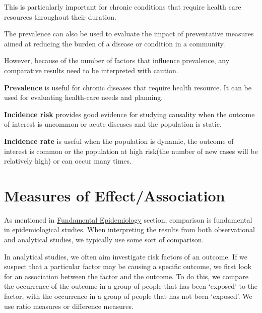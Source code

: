 \documentclass[
  letterpaper,
  DIV=11,
  numbers=noendperiod]{scrreprt}
\begin{document}
This is particularly important for chronic conditions that require
health care resources throughout their duration.

The prevalence can also be used to evaluate the impact of preventative
measures aimed at reducing the burden of a disease or condition in a
community.

However, because of the number of factors that influence prevalence, any
comparative results need to be interpreted with caution.

\begin{tcolorbox}[enhanced jigsaw, bottomtitle=1mm, breakable, colframe=quarto-callout-important-color-frame, leftrule=.75mm, opacityback=0, opacitybacktitle=0.6, left=2mm, colbacktitle=quarto-callout-important-color!10!white, coltitle=black, rightrule=.15mm, toptitle=1mm, colback=white, titlerule=0mm, title=\textcolor{quarto-callout-important-color}{\faExclamation}\hspace{0.5em}{Important}, arc=.35mm, bottomrule=.15mm, toprule=.15mm]

\textbf{Prevalence} is useful for chronic diseases that require health
resource. It can be used for evaluating health-care needs and planning.

\textbf{Incidence risk} provides good evidence for studying causality
when the outcome of interest is uncommon or acute diseases and the
population is static.

\textbf{Incidence rate} is useful when the population is dynamic, the
outcome of interest is common or the population at high risk(the number
of new cases will be relatively high) or can occur many times.

\end{tcolorbox}

\hypertarget{measures-of-effectassociation}{%
\chapter{Measures of
Effect/Association}\label{measures-of-effectassociation}}

As mentioned in \protect\hyperlink{fundamental-epidemiology}{Fundamental
Epidemiology} section, comparison is fundamental in epidemiological
studies. When interpreting the results from both observational and
analytical studies, we typically use some sort of comparison.

In analytical studies, we often aim investigate risk factors of an
outcome. If we suspect that a particular factor may be causing a
specific outcome, we first look for an association between the factor
and the outcome. To do this, we compare the occurrence of the outcome in
a group of people that has been `exposed' to the factor, with the
occurrence in a group of people that has not been `exposed'. We use
ratio measures or difference measures.
\end{document}
